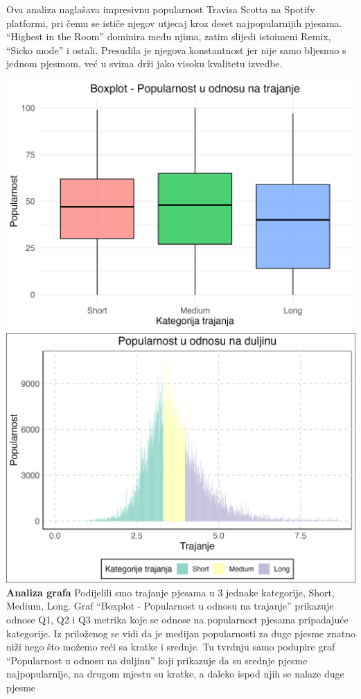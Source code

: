 \documentclass[
]{article}
\begin{document}
Ova analiza naglašava impresivnu popularnost Travisa Scotta na Spotify
platformi, pri čemu se ističe njegov utjecaj kroz deset najpopularnijih
pjesama. ``Highest in the Room'' dominira među njima, zatim slijedi
istoimeni Remix, ``Sicko mode'' i ostali. Presudila je njegova
konstantnost jer nije samo bljesnuo s jednom pjesmom, već u svima drži
jako visoku kvalitetu izvedbe.

\includegraphics{graf1.png} \includegraphics{graf2.png} \textbf{Analiza
grafa} Podijelili smo trajanje pjesama u 3 jednake kategorije, Short,
Medium, Long. Graf ``Boxplot - Popularnost u odnosu na trajanje''
prikazuje odnose Q1, Q2 i Q3 metrika koje se odnose na popularnost
pjesama pripadajuće kategorije. Iz priloženog se vidi da je medijan
popularnosti za duge pjesme znatno niži nego što možemo reći sa kratke i
srednje. Tu tvrdnju samo podupire graf ``Popularnost u odnosu na
duljinu'' koji prikazuje da su srednje pjesme najpopularnije, na drugom
mjestu su kratke, a daleko ispod njih se nalaze duge pjesme
\end{document}
